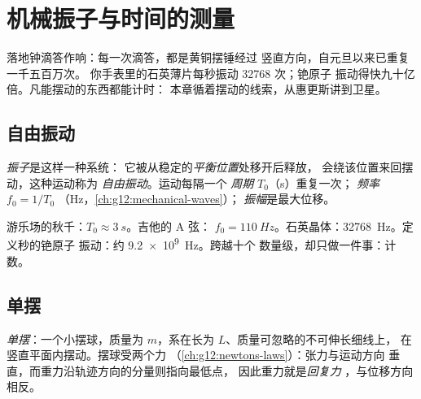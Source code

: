 \chapter{机械振子与时间的测量}\label{ch:g12:oscillators-and-time}

落地钟滴答作响：每一次滴答，都是黄铜摆锤经过
竖直方向，自元旦以来已重复一千五百万次。
你手表里的石英薄片每秒振动 \num{32768} 次；铯原子
振动得快九十亿倍。凡能摆动的东西都能计时：
本章循着摆动的线索，从惠更斯讲到卫星。

\section{自由振动}

\begin{definition}[振子、周期、频率、振幅]\label{def:g12:oscillators-and-time:oscillator}
\emph{振子}是这样一种系统：
它被从稳定的\emph{平衡位置}处移开后释放，
会绕该位置来回摆动，这种运动称为
\emph{自由振动}。运动每隔一个
\emph{周期} $T_0$（\unit{s}）重复一次；
\emph{频率} $f_0 = 1/T_0$
（\unit{Hz}，\cref{ch:g12:mechanical-waves}）；
\emph{振幅}是最大位移。
\end{definition}

\begin{example}[形形色色的振子]\label{ex:g12:oscillators-and-time:zoo}
游乐场的秋千：$T_0 \approx \qty{3}{s}$。吉他的 A 弦：
$f_0 = \qty{110}{Hz}$。石英晶体：\qty{32768}{Hz}。定义秒的铯原子
振动：约 \qty{9.2e9}{Hz}。跨越十个
数量级，却只做一件事：计数。
\end{example}

\section{单摆}

\begin{definition}[单摆]\label{def:g12:oscillators-and-time:pendulum}
\emph{单摆}：一个小摆球，质量为
$m$，系在长为 $L$、质量可忽略的不可伸长细线上，
在竖直平面内摆动。摆球受两个力
（\cref{ch:g12:newtons-laws}）：张力与运动方向
垂直，而重力沿轨迹方向的分量则指向最低点，
因此重力就是\emph{回复力}%
，与位移方向相反。
\end{definition}

